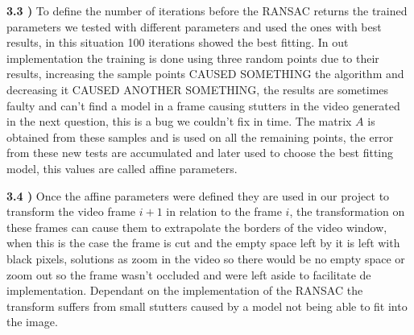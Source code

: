 \documentclass[12pt,a4paper]{article}
\begin{document}
\textbf{3.3 )} To define the number of iterations before the RANSAC returns the trained parameters we tested with different parameters and used the ones with best results, in this situation 100 iterations showed the best fitting. In out implementation the training is done using three random points due to their results, increasing the sample points CAUSED SOMETHING the algorithm and decreasing it CAUSED ANOTHER SOMETHING, the results are sometimes faulty and can't find a model in a frame causing stutters in the video generated in the next question, this is a bug we couldn't fix in time. The matrix $A$ is obtained from these samples and is used on all the remaining points, the error from these new tests are accumulated and later used to choose the best fitting model, this values are called affine parameters.
\par
\textbf{3.4 )} Once the affine parameters were defined they are used in our project to transform the video frame $i + 1$ in relation to the frame $i$, the transformation on these frames can cause them to extrapolate the borders of the video window, when this is the case the frame is cut and the empty space left by it is left with black pixels, solutions as zoom in the video so there would be no empty space or zoom out so the frame wasn't occluded and were left aside to facilitate de implementation. Dependant on the implementation of the RANSAC the transform suffers from small stutters caused by a model not being able to fit into the image.
\end{document}
